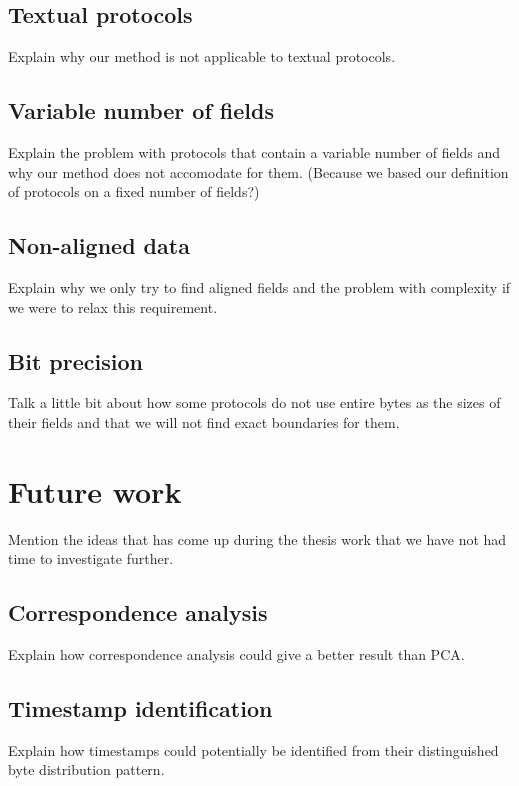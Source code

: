 \documentclass[a4paper]{report}
\begin{document}
\subsection{Textual protocols}
Explain why our method is not applicable to textual protocols.

\subsection{Variable number of fields}
Explain the problem with protocols that contain a variable number of fields and
why our method does not accomodate for them. (Because we based our definition
of protocols on a fixed number of fields?)

\subsection{Non-aligned data}
Explain why we only try to find aligned fields and the problem with complexity
if we were to relax this requirement.

\subsection{Bit precision}
Talk a little bit about how some protocols do not use entire bytes as the sizes
of their fields and that we will not find exact boundaries for them.

\section{Future work}
Mention the ideas that has come up during the thesis work that we have not had
time to investigate further.

\subsection{Correspondence analysis}
Explain how correspondence analysis could give a better result than PCA.

\subsection{Timestamp identification}
Explain how timestamps could potentially be identified from their distinguished
byte distribution pattern.



\end{document}
